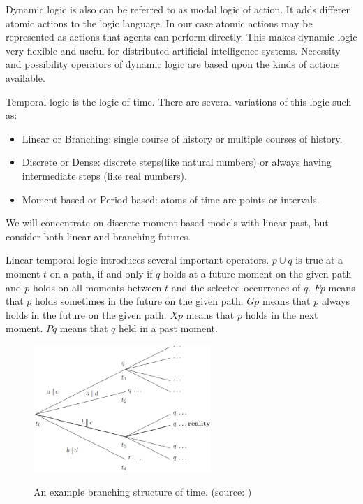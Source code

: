 Dynamic logic is also can be referred to as modal logic of action. It adds differen atomic actions to the logic language. In our case atomic actions may be represented as actions that agents can perform directly. This makes dynamic logic very flexible and useful for distributed artificial intelligence systems. Necessity and possibility operators of dynamic logic are based upon the kinds of actions available. \cite{Kozen_90}

Temporal logic is the logic of time. There are several variations of this logic such as:
\begin{itemize}
  \item Linear or Branching: single course of history or multiple courses of history.
  \item Discrete or Dense: discrete steps(like natural numbers) or always having intermediate steps (like real numbers).
  \item Moment-based or Period-based: atoms of time are points or intervals.
\end{itemize}
We will concentrate on discrete moment-based models with linear past, but consider both linear and branching futures.

Linear temporal logic introduces several important operators. $p\cup q$ is true at a moment $t$ on a path, if and only if $q$ holds at a future moment on
the given path and $p$ holds on all moments between $t$ and the selected occurrence of $q$. $Fp$ means that $p$ holds sometimes in the future on the given path. $Gp$ means that $p$ always holds in the future on the given path. $Xp$ means that $p$ holds in the next moment. $Pq$ means that $q$ held in a past moment. \cite{Singh_99}
%
\begin{figure}[h!]
\caption{An example branching structure of time. (source: \cite{Singh_99})}
\centering
\includegraphics[width=0.6\textwidth]{images/branching_logic.png}
\label{sci:for_branching_figure}
\end{figure}

